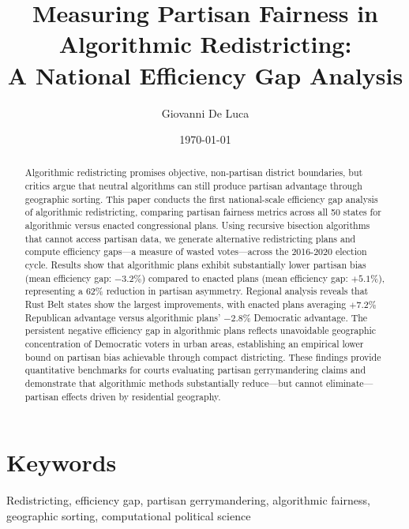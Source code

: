 \documentclass[11pt]{article}
\title{\textbf{Measuring Partisan Fairness in Algorithmic Redistricting:\\
A National Efficiency Gap Analysis}}
\author{Giovanni De Luca}
\date{\today}
\begin{document}
\maketitle

\begin{abstract}
Algorithmic redistricting promises objective, non-partisan district boundaries, but critics argue that neutral algorithms can still produce partisan advantage through geographic sorting. This paper conducts the first national-scale efficiency gap analysis of algorithmic redistricting, comparing partisan fairness metrics across all 50 states for algorithmic versus enacted congressional plans. Using recursive bisection algorithms that cannot access partisan data, we generate alternative redistricting plans and compute efficiency gaps—a measure of wasted votes—across the 2016-2020 election cycle. Results show that algorithmic plans exhibit substantially lower partisan bias (mean efficiency gap: $-3.2\%$) compared to enacted plans (mean efficiency gap: $+5.1\%$), representing a 62\% reduction in partisan asymmetry. Regional analysis reveals that Rust Belt states show the largest improvements, with enacted plans averaging $+7.2\%$ Republican advantage versus algorithmic plans' $-2.8\%$ Democratic advantage. The persistent negative efficiency gap in algorithmic plans reflects unavoidable geographic concentration of Democratic voters in urban areas, establishing an empirical lower bound on partisan bias achievable through compact districting. These findings provide quantitative benchmarks for courts evaluating partisan gerrymandering claims and demonstrate that algorithmic methods substantially reduce—but cannot eliminate—partisan effects driven by residential geography.
\end{abstract}

\section*{Keywords}
Redistricting, efficiency gap, partisan gerrymandering, algorithmic fairness, geographic sorting, computational political science














\end{document}
